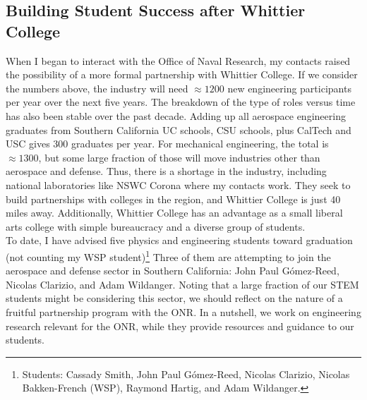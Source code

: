 \documentclass[../../../main.tex]{subfiles}
\begin{document}
\subsection{Building Student Success after Whittier College}

When I began to interact with the Office of Naval Research, my contacts raised the possibility of a more formal partnership with Whittier College.  If we consider the numbers above, the industry will need $\approx 1200$ new engineering participants per year over the next five years.  The breakdown of the type of roles versus time has also been stable over the past decade.  Adding up all aerospace engineering graduates from Southern California UC schools, CSU schools, plus CalTech and USC gives 300 graduates per year.  For mechanical engineering, the total is $\approx 1300$, but some large fraction of those will move industries other than aerospace and defense.  Thus, there is a shortage in the industry, including national laboratories like NSWC Corona where my contacts work.  They seek to build partnerships with colleges in the region, and Whittier College is just 40 miles away.  Additionally, Whittier College has an advantage as a small liberal arts college with simple bureaucracy and a diverse group of students.
\\
\vspace{0.25cm}
To date, I have advised five physics and engineering students toward graduation (not counting my WSP student)\footnote{Students: Cassady Smith, John Paul G\'{o}mez-Reed, Nicolas Clarizio, Nicolas Bakken-French (WSP), Raymond Hartig, and Adam Wildanger.}  Three of them are attempting to join the aerospace and defense sector in Southern California: John Paul G\'{o}mez-Reed, Nicolas Clarizio, and Adam Wildanger.  Noting that a large fraction of our STEM students might be considering this sector, we should reflect on the nature of a fruitful partnership program with the ONR.  In a nutshell, we work on engineering research relevant for the ONR, while they provide resources and guidance to our students.
\\
\vspace{0.25cm}
\end{document}
